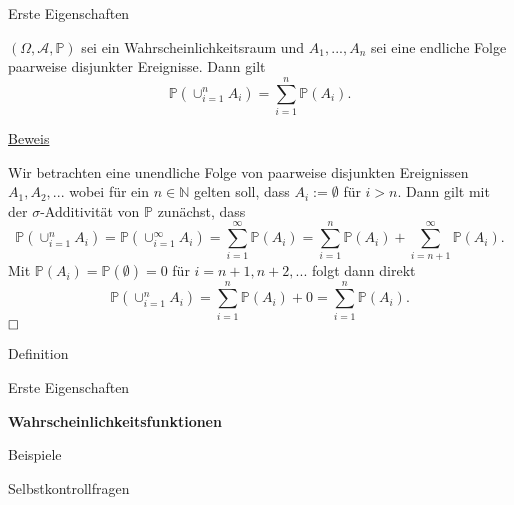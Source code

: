 \documentclass[
  8pt,
  ignorenonframetext,
]{beamer}
\begin{document}
\begin{frame}{Erste Eigenschaften}
\protect\hypertarget{erste-eigenschaften-1}{}
\small
\begin{theorem}
\normalfont
\justifying
$(\Omega, \mathcal{A}, \mathbb{P})$ sei ein Wahrscheinlichkeitsraum und $A_1,...,A_n$
sei eine endliche Folge paarweise disjunkter Ereignisse. Dann gilt
\begin{equation}
\mathbb{P}(\cup_{i=1}^n A_i) = \sum_{i=1}^n \mathbb{P}(A_i).
\end{equation}
\end{theorem}

\footnotesize

\underline{Beweis}

Wir betrachten eine unendliche Folge von paarweise disjunkten
Ereignissen \(A_1, A_2, ...\) wobei für ein \(n\in \mathbb{N}\) gelten
soll, dass \(A_i := \emptyset\) für \(i>n\). Dann gilt mit der
\(\sigma\)-Additivität von \(\mathbb{P}\) zunächst, dass
\begin{equation}
\mathbb{P}\left(\cup_{i=1}^n A_i\right)
= \mathbb{P}\left(\cup_{i=1}^\infty A_i\right)
= \sum_{i=1}^\infty \mathbb{P}\left(A_i\right)
= \sum_{i=1}^n \mathbb{P}\left(A_i\right) + \sum_{i=n+1}^\infty \mathbb{P}\left(A_i\right).
\end{equation} Mit
\(\mathbb{P}\left(A_i\right) = \mathbb{P}(\emptyset) = 0\) für
\(i = n+1, n+2,...\) folgt dann direkt \begin{equation}
\mathbb{P}\left(\cup_{i=1}^n A_i\right)
= \sum_{i=1}^n \mathbb{P}\left(A_i\right) + 0
= \sum_{i=1}^n \mathbb{P}\left(A_i\right).
\end{equation} \(\hfill\Box\)
\end{frame}

\begin{frame}{}
\protect\hypertarget{section-8}{}
\large
\vfill

Definition

Erste Eigenschaften

\textbf{Wahrscheinlichkeitsfunktionen}

Beispiele

Selbstkontrollfragen \vfill
\end{frame}
\end{document}
